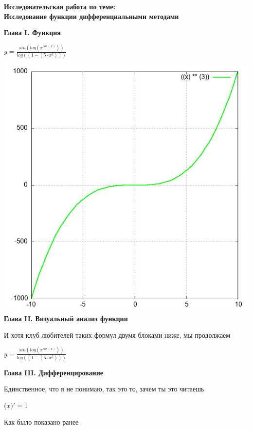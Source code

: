 \documentclass[12pt,a4paper,fleqn]{article}
\begin{document}
\begin{center}
\textbf{\LARGE{Исследовательская работа по теме:\\Исследование функции дифференциальными методами}}\end{center}\newpage\textbf{\LARGE Глава I. Функция}

\begin{center}
$y = $$\frac{sin(log(x^{cos(x)}))}{log((1-(5 \cdot x^{3})))}$

\end{center}
\includegraphics{GraphicDumps/plot.jpg}\newpage \textbf{\LARGE Глава II. Визуальный анализ функции}

И хотя клуб любителей таких формул двумя блоками ниже, мы продолжаем

\begin{center}
$y = $$\frac{sin(log(x^{cos(x)}))}{log((1-(5 \cdot x^{3})))}$

\end{center}
\newpage \textbf{\LAGRE Глава III. Дифференцирование}

Единственное, что я не понимаю, так это то, зачем ты это читаешь

\begin{center}
 ($x)'
  = 1$\end{center}
Как было показано ранее
\end{document}
